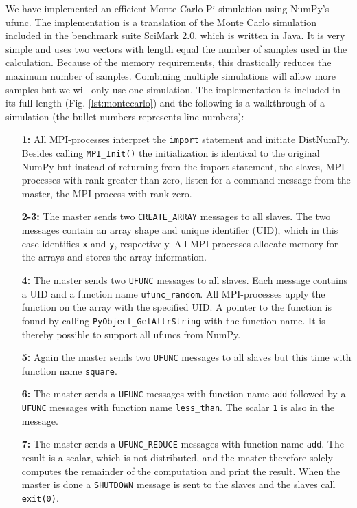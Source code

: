\documentclass[10pt]{article}
\begin{document}
We have implemented an efficient Monte Carlo Pi simulation using NumPy's ufunc. The implementation is a translation of the Monte Carlo simulation included in the benchmark suite SciMark 2.0\cite{SciMark}, which is written in Java. It is very simple and uses two vectors with length equal the number of samples used in the calculation. Because of the memory requirements, this drastically reduces the maximum number of samples. Combining multiple simulations will allow more samples but we will only use one simulation. The implementation is included in its full length (Fig. \ref{lst:montecarlo}) and the following is a walkthrough of a simulation (the bullet-numbers represents line numbers):

\begin{enumerate}
\item[\textbf{1:}] All MPI-processes interpret the \texttt{import} statement and initiate DistNumPy. Besides calling \texttt{MPI\_Init()} the initialization is identical to the original NumPy but instead of returning from the import statement, the slaves, MPI-processes with rank greater than zero, listen for a command message from the master, the MPI-process with rank zero.
\item[\textbf{2-3:}] The master sends two \texttt{CREATE\_ARRAY} messages to all slaves. The two messages contain an array shape and unique identifier (UID), which in this case identifies \texttt{x} and \texttt{y}, respectively. All MPI-processes allocate memory for the arrays and stores the array information.
\item[\textbf{4:}] The master sends two \texttt{UFUNC} messages to all slaves. Each message contains a UID and a function name \texttt{ufunc\_random}. All MPI-processes apply the function on the array with the specified UID. A pointer to the function is found by calling \texttt{PyObject\_GetAttrString} with the function name. It is thereby possible to support all ufuncs from NumPy.
\item[\textbf{5:}] Again the master sends two \texttt{UFUNC} messages to all slaves but this time with function name \texttt{square}.
\item[\textbf{6:}] The master sends a \texttt{UFUNC} messages with function name \texttt{add} followed by a \texttt{UFUNC} messages with function name \texttt{less\_than}. The scalar \texttt{1} is also in the message.
\item[\textbf{7:}] The master sends a \texttt{UFUNC\_REDUCE} messages with function name \texttt{add}. The result is a scalar, which is not distributed, and the master therefore solely computes the remainder of the computation and print the result. When the master is done a \texttt{SHUTDOWN} message is sent to the slaves and the slaves call \texttt{exit(0)}.
\end{enumerate}
\end{document}
